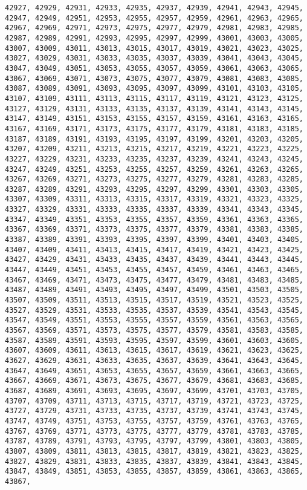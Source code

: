 \documentclass[11pt]{article}
\begin{document}
\begin{Verbatim}[commandchars=\\\{\}]
42927, 42929, 42931, 42933, 42935, 42937, 42939, 42941, 42943, 42945, 42947, 42949, 42951, 42953, 42955, 42957, 42959, 42961, 42963, 42965, 42967, 42969, 42971, 42973, 42975, 42977, 42979, 42981, 42983, 42985, 42987, 42989, 42991, 42993, 42995, 42997, 42999, 43001, 43003, 43005, 43007, 43009, 43011, 43013, 43015, 43017, 43019, 43021, 43023, 43025, 43027, 43029, 43031, 43033, 43035, 43037, 43039, 43041, 43043, 43045, 43047, 43049, 43051, 43053, 43055, 43057, 43059, 43061, 43063, 43065, 43067, 43069, 43071, 43073, 43075, 43077, 43079, 43081, 43083, 43085, 43087, 43089, 43091, 43093, 43095, 43097, 43099, 43101, 43103, 43105, 43107, 43109, 43111, 43113, 43115, 43117, 43119, 43121, 43123, 43125, 43127, 43129, 43131, 43133, 43135, 43137, 43139, 43141, 43143, 43145, 43147, 43149, 43151, 43153, 43155, 43157, 43159, 43161, 43163, 43165, 43167, 43169, 43171, 43173, 43175, 43177, 43179, 43181, 43183, 43185, 43187, 43189, 43191, 43193, 43195, 43197, 43199, 43201, 43203, 43205, 43207, 43209, 43211, 43213, 43215, 43217, 43219, 43221, 43223, 43225, 43227, 43229, 43231, 43233, 43235, 43237, 43239, 43241, 43243, 43245, 43247, 43249, 43251, 43253, 43255, 43257, 43259, 43261, 43263, 43265, 43267, 43269, 43271, 43273, 43275, 43277, 43279, 43281, 43283, 43285, 43287, 43289, 43291, 43293, 43295, 43297, 43299, 43301, 43303, 43305, 43307, 43309, 43311, 43313, 43315, 43317, 43319, 43321, 43323, 43325, 43327, 43329, 43331, 43333, 43335, 43337, 43339, 43341, 43343, 43345, 43347, 43349, 43351, 43353, 43355, 43357, 43359, 43361, 43363, 43365, 43367, 43369, 43371, 43373, 43375, 43377, 43379, 43381, 43383, 43385, 43387, 43389, 43391, 43393, 43395, 43397, 43399, 43401, 43403, 43405, 43407, 43409, 43411, 43413, 43415, 43417, 43419, 43421, 43423, 43425, 43427, 43429, 43431, 43433, 43435, 43437, 43439, 43441, 43443, 43445, 43447, 43449, 43451, 43453, 43455, 43457, 43459, 43461, 43463, 43465, 43467, 43469, 43471, 43473, 43475, 43477, 43479, 43481, 43483, 43485, 43487, 43489, 43491, 43493, 43495, 43497, 43499, 43501, 43503, 43505, 43507, 43509, 43511, 43513, 43515, 43517, 43519, 43521, 43523, 43525, 43527, 43529, 43531, 43533, 43535, 43537, 43539, 43541, 43543, 43545, 43547, 43549, 43551, 43553, 43555, 43557, 43559, 43561, 43563, 43565, 43567, 43569, 43571, 43573, 43575, 43577, 43579, 43581, 43583, 43585, 43587, 43589, 43591, 43593, 43595, 43597, 43599, 43601, 43603, 43605, 43607, 43609, 43611, 43613, 43615, 43617, 43619, 43621, 43623, 43625, 43627, 43629, 43631, 43633, 43635, 43637, 43639, 43641, 43643, 43645, 43647, 43649, 43651, 43653, 43655, 43657, 43659, 43661, 43663, 43665, 43667, 43669, 43671, 43673, 43675, 43677, 43679, 43681, 43683, 43685, 43687, 43689, 43691, 43693, 43695, 43697, 43699, 43701, 43703, 43705, 43707, 43709, 43711, 43713, 43715, 43717, 43719, 43721, 43723, 43725, 43727, 43729, 43731, 43733, 43735, 43737, 43739, 43741, 43743, 43745, 43747, 43749, 43751, 43753, 43755, 43757, 43759, 43761, 43763, 43765, 43767, 43769, 43771, 43773, 43775, 43777, 43779, 43781, 43783, 43785, 43787, 43789, 43791, 43793, 43795, 43797, 43799, 43801, 43803, 43805, 43807, 43809, 43811, 43813, 43815, 43817, 43819, 43821, 43823, 43825, 43827, 43829, 43831, 43833, 43835, 43837, 43839, 43841, 43843, 43845, 43847, 43849, 43851, 43853, 43855, 43857, 43859, 43861, 43863, 43865, 43867, 
\end{Verbatim}
\end{document}
